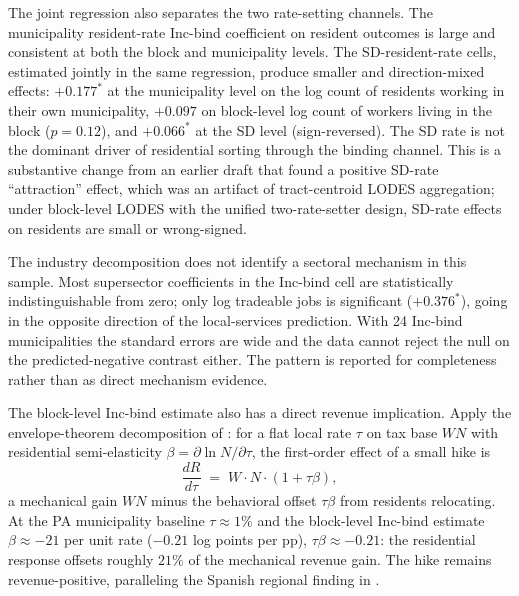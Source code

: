 \documentclass[12pt]{article}
\begin{document}
The joint regression also separates the two rate-setting channels.
The municipality resident-rate Inc-bind coefficient on resident outcomes is
large and consistent at both the block and municipality levels. The
SD-resident-rate cells, estimated jointly in the same regression,
produce smaller and direction-mixed effects: $+0.177^{*}$ at the
municipality level on the log count of residents working in their own municipality, $+0.097$ on
block-level log count of workers living in the block ($p=0.12$), and $+0.066^{*}$
at the SD level (sign-reversed). The SD rate is not the dominant
driver of residential sorting through the binding channel. This is a
substantive change from an earlier draft that found a positive SD-rate
``attraction'' effect, which was an artifact of tract-centroid LODES
aggregation; under block-level LODES with the unified two-rate-setter
design, SD-rate effects on residents are small or wrong-signed.

The industry decomposition does not identify a sectoral mechanism
in this sample. Most supersector coefficients in the Inc-bind cell
are statistically indistinguishable from zero; only log tradeable
jobs is significant ($+0.376^{*}$), going in the opposite direction
of the local-services prediction. With 24 Inc-bind municipalities
the standard errors are wide and the data cannot reject the null on
the predicted-negative contrast either. The pattern is reported for
completeness rather than as direct mechanism evidence.

The block-level Inc-bind estimate also has a direct revenue implication.
Apply the envelope-theorem decomposition of
\citet{saezUsingElasticitiesDerive2001}: for a flat local rate
$\tau$ on tax base $WN$ with residential semi-elasticity
$\beta = \partial \ln N / \partial \tau$, the first-order effect
of a small hike is
\[
  \frac{dR}{d\tau} \;=\; W \cdot N \cdot (1 + \tau\beta),
\]
a mechanical gain $WN$ minus the behavioral offset $\tau\beta$ from
residents relocating. At the PA municipality baseline $\tau \approx 1\%$
and the block-level Inc-bind estimate $\beta \approx -21$ per unit
rate ($-0.21$ log points per pp), $\tau\beta \approx -0.21$: the
residential response offsets roughly $21\%$ of the mechanical
revenue gain. The hike remains revenue-positive, paralleling the
Spanish regional finding in
\citet{agrawalRelocationRichMigration2019}.
\end{document}
